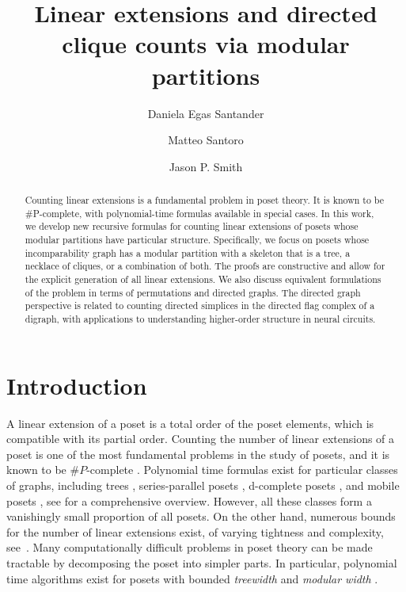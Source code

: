 \documentclass[9pt,a4paper,oneside]{article}
\title{Linear extensions and directed clique counts via modular partitions}
\author[1]{Daniela Egas Santander}
\author[2]{Matteo Santoro}
\author[3]{Jason P. Smith}
\affil[1]{Max Planck Institute of Molecular Cell Biology and Genetics and Center for Systems Biology, Dresden, Germany}
\affil[2]{SISSA, Trieste, Italy}
\affil[3]{Nottingham Trent University, Nottingham, UK}
\date{}
\begin{document}
	\maketitle
	

\begin{abstract}
    Counting linear extensions is a fundamental problem in poset theory. It is known to be \#P-complete, with polynomial-time formulas available in special cases. In this work, we develop new recursive formulas for counting linear extensions of posets whose modular partitions have particular structure. Specifically, we focus on posets whose incomparability graph has a modular partition with a skeleton that is a tree, a necklace of cliques, or a combination of both. The proofs are constructive and allow for the explicit generation of all linear extensions. We also discuss equivalent formulations of the problem in terms of permutations and directed graphs. 
    The directed graph perspective is related to counting directed simplices in the directed flag complex of a digraph, with applications to understanding higher-order structure in neural circuits.
\end{abstract}

\section{Introduction}
A linear extension of a poset is a total order of the poset elements, which is compatible with its partial order. 
Counting the number of linear extensions of a poset is one of the most fundamental problems in the study of posets, and it is known to be $\# P$-complete \cite{BW91}.
Polynomial time formulas exist for particular classes of graphs, including
 trees \cite{Atk90}, series-parallel posets \cite{Val79}, d-complete posets \cite{Pro14}, and mobile posets \cite{Gar21}, 
 see \cite[Section 12.1]{Cha23} for a comprehensive overview. However, all these classes form a vanishingly small proportion of all posets. 
 On the other hand, numerous bounds for the number of linear extensions exist, of varying tightness and complexity, see~\cite{Cha23}.
Many computationally difficult problems in poset theory can be made tractable by decomposing the poset into simpler parts.
In particular, polynomial time algorithms exist for posets with bounded \emph{treewidth} \cite{Eib19} and \emph{modular width} \cite{Hab87,Dien23}.
\end{document}
